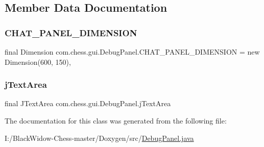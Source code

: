 \subsection{Member Data Documentation}
\mbox{\label{classcom_1_1chess_1_1gui_1_1_debug_panel_a0f94b47fa97bab91c1dfa9de0f0de8be}} 
\subsubsection{\texorpdfstring{CHAT\_PANEL\_DIMENSION}{CHAT\_PANEL\_DIMENSION}}
{\footnotesize\ttfamily final Dimension com.\+chess.\+gui.\+Debug\+Panel.\+C\+H\+A\+T\+\_\+\+P\+A\+N\+E\+L\+\_\+\+D\+I\+M\+E\+N\+S\+I\+ON = new Dimension(600, 150)\hspace{0.3cm}{\ttfamily [static]}, {\ttfamily [private]}}

\mbox{\label{classcom_1_1chess_1_1gui_1_1_debug_panel_a2819e262e8a9d2208c9fc69e6e35866a}} 
\subsubsection{\texorpdfstring{jTextArea}{jTextArea}}
{\footnotesize\ttfamily final J\+Text\+Area com.\+chess.\+gui.\+Debug\+Panel.\+j\+Text\+Area\hspace{0.3cm}{\ttfamily [private]}}



The documentation for this class was generated from the following file\+:\begin{DoxyCompactItemize}
\item 
I\+:/\+Black\+Widow-\/\+Chess-\/master/\+Doxygen/src/\mbox{\hyperlink{_debug_panel_8java}{Debug\+Panel.\+java}}\end{DoxyCompactItemize}
